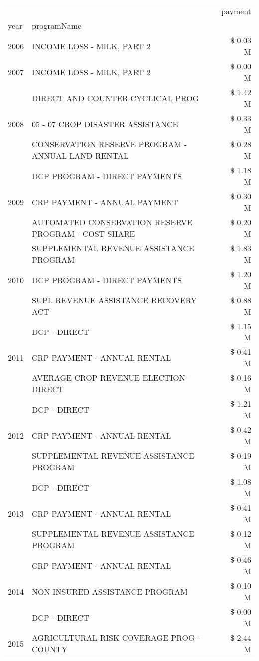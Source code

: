 \begin{tabular}{llr}
\toprule
 &  & payment \\
year & programName &  \\
\midrule
2006 & INCOME LOSS - MILK, PART 2 & \$ 0.03 M \\
\cline{1-3}
2007 & INCOME LOSS - MILK, PART 2 & \$ 0.00 M \\
\cline{1-3}
\multirow[t]{3}{*}{2008} & DIRECT AND COUNTER CYCLICAL PROG & \$ 1.42 M \\
 & 05 - 07 CROP DISASTER ASSISTANCE & \$ 0.33 M \\
 & CONSERVATION RESERVE PROGRAM - ANNUAL LAND RENTAL & \$ 0.28 M \\
\cline{1-3}
\multirow[t]{3}{*}{2009} & DCP PROGRAM - DIRECT PAYMENTS & \$ 1.18 M \\
 & CRP PAYMENT - ANNUAL PAYMENT & \$ 0.30 M \\
 & AUTOMATED CONSERVATION RESERVE PROGRAM - COST SHARE & \$ 0.20 M \\
\cline{1-3}
\multirow[t]{3}{*}{2010} & SUPPLEMENTAL REVENUE ASSISTANCE PROGRAM & \$ 1.83 M \\
 & DCP PROGRAM - DIRECT PAYMENTS & \$ 1.20 M \\
 & SUPL REVENUE ASSISTANCE RECOVERY ACT & \$ 0.88 M \\
\cline{1-3}
\multirow[t]{3}{*}{2011} & DCP - DIRECT & \$ 1.15 M \\
 & CRP PAYMENT - ANNUAL RENTAL & \$ 0.41 M \\
 & AVERAGE CROP REVENUE ELECTION-DIRECT & \$ 0.16 M \\
\cline{1-3}
\multirow[t]{3}{*}{2012} & DCP - DIRECT & \$ 1.21 M \\
 & CRP PAYMENT - ANNUAL RENTAL & \$ 0.42 M \\
 & SUPPLEMENTAL REVENUE ASSISTANCE PROGRAM & \$ 0.19 M \\
\cline{1-3}
\multirow[t]{3}{*}{2013} & DCP - DIRECT & \$ 1.08 M \\
 & CRP PAYMENT - ANNUAL RENTAL & \$ 0.41 M \\
 & SUPPLEMENTAL REVENUE ASSISTANCE PROGRAM & \$ 0.12 M \\
\cline{1-3}
\multirow[t]{3}{*}{2014} & CRP PAYMENT - ANNUAL RENTAL & \$ 0.46 M \\
 & NON-INSURED ASSISTANCE PROGRAM & \$ 0.10 M \\
 & DCP - DIRECT & \$ 0.00 M \\
\cline{1-3}
\multirow[t]{3}{*}{2015} & AGRICULTURAL RISK COVERAGE PROG - COUNTY & \$ 2.44 M \\

\end{tabular}
